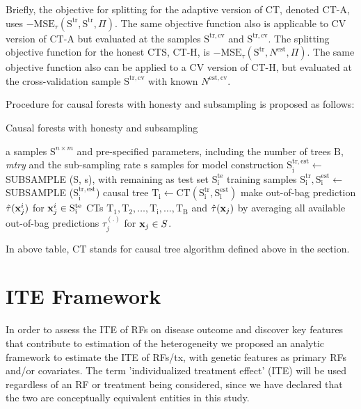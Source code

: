     Briefly, the objective for splitting for the adaptive version of CT, denoted CT-A, uses $-\mathrm{MSE}_\tau (\mathrm{S^{tr}}, \mathrm{S^{tr}}, \Pi)$. The same objective function also is applicable to CV version of CT-A but evaluated at the samples $\mathrm{S^{tr, cv}}$ and $\mathrm{S^{tr,cv}}$. The splitting objective function for the honest CTS, CT-H, is $-\mathrm{MSE}_\tau (\mathrm{S^{tr}}, N^{\mathrm{est}}, \Pi)$. The same objective function also can be applied to a CV version of CT-H, but evaluated at the cross-validation sample $\mathrm{S^{tr, cv}}$ with known $N^{\mathrm{est, cv}}$.

    Procedure for causal forests with honesty and subsampling is proposed as follows:
    \begin{algorithm}
      \caption{Causal forests with honesty and subsampling}
      \label{cf_algthm}
      \begin{algorithmic}[1]
        \REQUIRE a samples $\mathrm{S}^{n \times m}$ and pre-specified parameters, including the number of trees $\mathrm{B}$, \textit{mtry} and the sub-sampling rate $\mathrm{s}$ 
          \STATE samples for model construction $\mathrm{S_i^{tr, est}} \leftarrow$ \uppercase{Subsample} (S, s), with remaining as test set $\mathrm{S_i^{te}}$
          \STATE training samples $\mathrm{S_i^{tr}, S_i^{est}} \leftarrow$ \uppercase{Subsample} ($\mathrm{S_i^{tr, est}}$)
          \STATE causal tree $\mathrm{T_i} \leftarrow \mathrm{CT} (\mathrm{S_i^{tr}, S_i^{est}})$
          \STATE make out-of-bag prediction $\hat{\tau}(\mathbf{x}_j^i)$ for $\mathbf{x}_j^i \in \mathrm{S_i^{te}}$
        \ENDFOR
        \RETURN CTs $\mathrm{T_1}, \mathrm{T_2}, \dots , \mathrm{T_i}, \dots, \mathrm{T_B}$ and $\hat{\tau}(\mathbf{x}_j)$ by averaging all available out-of-bag predictions $\tau_j^{(.)}$ for $\mathbf{x}_{j} \in S$.

      \end{algorithmic}
    \end{algorithm}
    In above table, $\mathrm{CT}$ stands for causal tree algorithm defined above in the section.

\section{ITE Framework}
\label{sec:ite_model}
  In order to assess the ITE of RFs on disease outcome and discover key features that contribute to estimation of the heterogeneity we proposed an analytic framework to estimate the ITE of RFs/tx, with genetic features as primary RFs and/or covariates. The term 'individualized treatment effect' (ITE) will be used regardless of an RF or treatment being considered, since we have declared that the two are conceptually equivalent entities in this study. 

